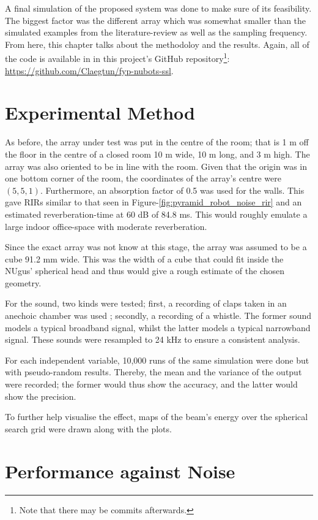 \documentclass[notitlepage]{report}
\begin{document}
A final simulation of the proposed system was done to make sure of its feasibility. The biggest factor was the different array which was somewhat smaller than the simulated examples from the literature-review as well as the sampling frequency. From here, this chapter talks about the methodoloy and the results. Again, all of the code is available in in this project's GitHub repository\footnote{Note that there may be commits afterwards.}: \url{https://github.com/Claegtun/fyp-nubots-ssl}.

\section{Experimental Method}

As before, the array under test was put in the centre of the room; that is 1 \si{m} off the floor in the centre of a closed room 10 \si{m} wide, 10 \si{m} long, and 3 \si{m} high. The array was also oriented to be in line with the room. Given that the origin was in one bottom corner of the room, the coordinates of the array's centre were $(5,5,1)$. Furthermore, an absorption factor of 0.5 was used for the walls. This gave RIRs similar to that seen in Figure-\ref{fig:pyramid_robot_noise_rir} and an estimated reverberation-time at 60 \si{dB} of 84.8 \si{ms}. This would roughly emulate a large indoor office-space with moderate reverberation.

Since the exact array was not know at this stage, the array was assumed to be a cube 91.2 \si{mm} wide. This was the width of a cube that could fit inside the NUgus' spherical head and thus would give a rough estimate of the chosen geometry.

For the sound, two kinds were tested; first, a recording of claps taken in an anechoic chamber was used \cite{noauthor_handclaps_2005}; secondly, a recording of a whistle. The former sound models a typical broadband signal, whilst the latter models a typical narrowband signal. These sounds were resampled to 24 \si{kHz} to ensure a consistent analysis.

For each independent variable, 10,000 runs of the same simulation were done but with pseudo-random results. Thereby, the mean and the variance of the output were recorded; the former would thus show the accuracy, and the latter would show the precision.

To further help visualise the effect, maps of the beam's energy over the spherical search grid were drawn along with the plots.

\section{Performance against Noise} \label{Performance_against_Noise}
\end{document}
